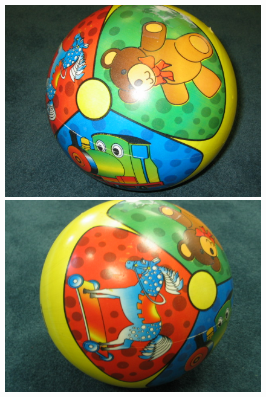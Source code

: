 \documentclass[10pt,conference,a4paper]{IEEEtran}
\begin{document}
\begin{figure}
{				\includegraphics[scale=0.091]{ukbench09985.jpg}
				\includegraphics[scale=0.091]{ukbench09987.jpg}
			}


\end{figure}
\end{document}
